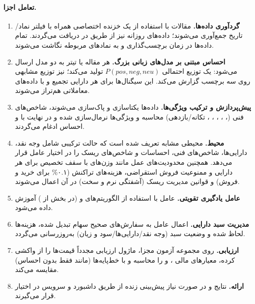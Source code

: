 \documentclass[12pt, a4paper]{report}
\begin{document}
\paragraph{تعامل اجزا.}
\begin{enumerate}
    \item \textbf{گردآوری داده‌ها.} مقالات  با استفاده از یک خزنده اختصاصی همراه با فیلتر نماد/تاریخ جمع‌آوری می‌شوند؛ داده‌های روزانه  نیز از طریق  در  دریافت می‌گردند. تمام داده‌ها در زمان  برچسب‌گذاری و به نمادهای مربوطه نگاشت می‌شوند.
    
    \item \textbf{احساس مبتنی بر مدل‌های زبانی بزرگ.} هر مقاله یا تیتر به دو مدل ارسال می‌شود:  یک توزیع احتمالی \(P(pos, neg, neu)\) تولید می‌کند؛  نیز توزیع مشابهی روی سه برچسب گزارش می‌کند. این سیگنال‌ها برای هر دارایی تجمیع و با داده‌های معاملاتی هم‌تراز می‌شوند.
    
    \item \textbf{پیش‌پردازش و ترکیب ویژگی‌ها.} داده‌ها یکتا‌سازی و پاک‌سازی می‌شوند، شاخص‌های فنی (، ، ، ، ، تکانه/بازدهی) محاسبه و ویژگی‌ها نرمال‌سازی شده و در نهایت با  و احساس ادغام می‌گردند.
    
\item \textbf{محیط.} محیطی مشابه  تعریف شده است که حالت ترکیبی شامل وجه نقد، دارایی‌ها، شاخص‌های فنی، احساسات و شاخص‌های ریسک را در اختیار عامل قرار می‌دهد. همچنین محدودیت‌های عمل مانند وزن‌های  با سقف تخصیص برای هر دارایی و ممنوعیت فروش استقراضی، هزینه‌های تراکنش (۰.۱\% برای خرید و فروش) و قوانین مدیریت ریسک (آشفتگی نرم و سخت) در آن اعمال می‌شوند.
    
\item \textbf{عامل یادگیری تقویتی.} عامل با استفاده از الگوریتم‌های  و  (در بخش  از ) آموزش داده می‌شود.  
    
    \item \textbf{مدیریت سبد دارایی.} اعمال عامل به سفارش‌های صحیح سهام تبدیل شده، هزینه‌ها لحاظ شده و وضعیت سبد (وجه نقد/دارایی‌ها/سود و زیان) به‌روزرسانی می‌گردد.
    
    \item \textbf{ارزیابی.} روی مجموعه آزمون مجزا، ماژول ارزیابی مجدداً قیمت‌ها را از  واکشی کرده، معیارهای مالی ،  و  را محاسبه و با خط‌پایه‌ها (مانند فقط  بدون احساس) مقایسه می‌کند.
    
    \item \textbf{ارائه.} نتایج و در صورت نیاز پیش‌بینی زنده از طریق داشبورد  و سرویس  در اختیار قرار می‌گیرند.
\end{enumerate}
\end{document}
